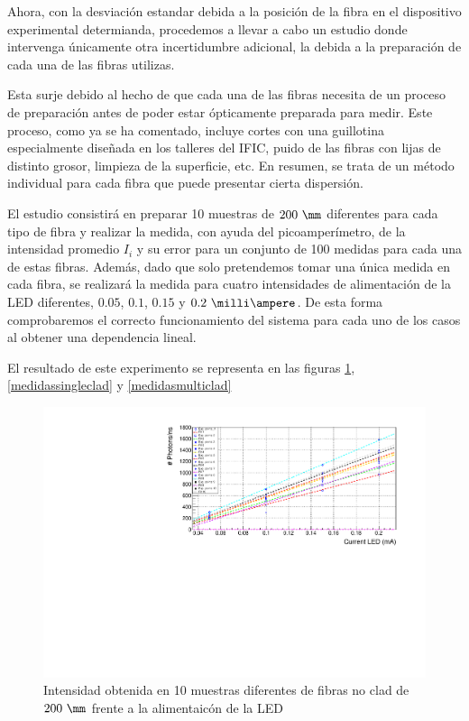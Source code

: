 Ahora, con la desviación estandar debida a la posición de la fibra en el dispositivo experimental determianda, procedemos a llevar a cabo un estudio donde intervenga únicamente otra incertidumbre adicional, la debida a la preparación de cada una de las fibras utilizas.

Esta surje debido al hecho de que cada una de las fibras necesita de un proceso de preparación antes de poder estar ópticamente preparada para medir. Este proceso, como ya se ha comentado, incluye cortes con una guillotina especialmente diseñada en los talleres del IFIC, puido de las fibras con lijas de distinto grosor, limpieza de la superficie, etc. En resumen, se trata de un método individual para cada fibra que puede presentar cierta dispersión.

El estudio consistirá en preparar 10 muestras de $200~\mm$ diferentes para cada tipo de fibra y realizar la medida, con ayuda del picoamperímetro, de la intensidad promedio $I_i$ y su error para un conjunto de 100 medidas para cada una de estas fibras. Además, dado que solo pretendemos tomar una única medida en cada fibra, se realizará la medida para cuatro intensidades de alimentación de la LED diferentes, $0.05$, $0.1$, $0.15$ y $0.2~\milli\ampere$. De esta forma comprobaremos el correcto funcionamiento del sistema para cada uno de los casos al obtener una dependencia lineal.

El resultado de este experimento se representa en las figuras \ref{medidasnoclad}, \ref{medidassingleclad} y \ref{medidasmulticlad} 

\begin{figure}[hbtp]
\centering
\includegraphics[scale=0.7]{Figuras/SamplesNoClad.pdf}
\caption{Intensidad obtenida en 10 muestras diferentes de fibras no clad de $200~\mm$ frente a la alimentaicón de la LED\label{medidasnoclad}}
\end{figure}

